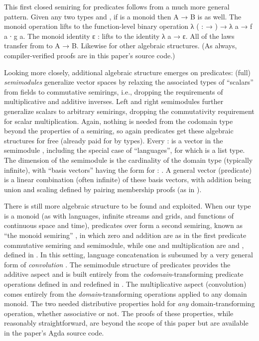 \documentclass[acmsmall,screen,timestamp,anonymous,review]{acmart}
\begin{document}
This first closed semiring for predicates follows from a much more general pattern.
Given any two types  and , if  is a monoid then {\AB A \AS → \AB B} is as well.
The monoid operation  lifts to the function-level binary operation {\AS λ (  :  \AS → ) \AS → \AS λ \AB a \AS → \AB f \AB a \AB ∙ \AB g \AB a}.
The monoid identity {\AB ε \AS : } lifts to the identity {\AS λ \AB a \AS → \AB ε}.
All of the laws transfer from  to {\AB A \AS → \AB B}.
Likewise for other algebraic structures.
(As always, compiler-verified proofs are in this paper's source code.)

Looking more closely, additional algebraic structure emerges on predicates: (full) \emph{semimodules} generalize vector spaces by relaxing the associated types of ``scalars'' from fields to commutative semirings, i.e., dropping the requirements of multiplicative and additive inverses.
Left and right semimodules further generalize scalars to arbitrary semirings, dropping the commutativity requirement for scalar multiplication.
Again, nothing is needed from the codomain type  beyond the properties of a semiring, so again predicates get these algebraic structures for free (already paid for by types).
Every { \AS :  } is a vector in the semimodule { }, including the special case of ``languages'', for which  is a list type.
The dimension of the semimodule is the cardinality of the domain type  (typically infinite), with ``basis vectors'' having the form { } for { \AS : }.
A general vector (predicate) is a linear combination (often infinite) of these basis vectors, with addition being union and scaling defined by pairing membership proofs (as in ).

There is still more algebraic structure to be found and exploited.
When our  type  is a monoid (as with languages, infinite streams and grids, and functions of continuous space and time), predicates over  form a second semiring, known as ``the monoid semiring'' \citep{Golan2005RecentSemi}, in which zero and addition are as in the first predicate commutative semiring and semimodule, while one and multiplication are  and , defined in .
In this setting, language concatenation is subsumed by a very general form of \emph{convolution} \cite{Golan2005RecentSemi, Dongol2016CUC, Elliott2019-convolution}.
The semimodule structure of predicates provides the additive aspect and is built entirely from the \emph{codomain}-transforming predicate operations defined in  and redefined in .
The multiplicative aspect (convolution) comes entirely from the \emph{domain}-transforming operations applied to any domain monoid.
The two needed distributive properties hold for \emph{any} domain-transforming operation, whether associative or not.
The proofs of these properties, while reasonably straightforward, are beyond the scope of this paper but are available in the paper's Agda source code.
\end{document}
